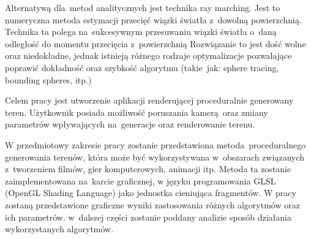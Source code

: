 Alternatywą dla~metod analitycznych jest technika ray marching. Jest to numeryczna metoda estymacji przecięć
wiązki światła z~dowolną powierzchnią.
Technika ta polega na~sukcesywnym przesuwaniu wiązki światła o~daną odległość do momentu przecięcia z~powierzchnią
Rozwiązanie to jest dość wolne oraz niedokładne, jednak istnieją różnego rodzaje optymalizacje
pozwalające poprawić dokładność oraz szybkość algorytmu (takie~jak: sphere tracing, bounding spheres, itp.)

Celem pracy jest utworzenie aplikacji renderującej proceduralnie generowany teren. Użytkownik posiada możliwość poruszania kamerą oraz zmiany parametrów wpływających na~generacje oraz renderowanie terenu.

W przedmiotowy zakresie pracy zostanie przedstawiona metoda proceduralnego generowania
terenów, która może być wykorzystywana w~obszarach związanych z~tworzeniem filmów, gier komputerowych, animacji itp. Metoda ta zostanie zaimplementowana na~karcie graficznej, w języku programowania GLSL (OpenGL Shading Language) jako jednostka cieniująca fragmentów.
W pracy zostaną przedstawione graficzne wyniki zastosowania różnych algorytmów oraz ich parametrów. w~dalszej części zostanie poddany analizie sposób działania wykorzystanych algorytmów.


